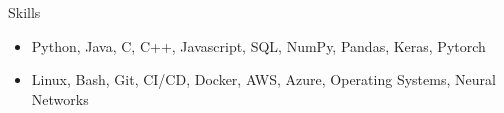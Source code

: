 \documentclass[]{mcdowellcv}
\begin{document}
\begin{cvsection}{Skills}
	\begin{cvsubsection}{}{}{}
		\begin{itemize}
			\item  Python, Java, C, C++, Javascript, SQL, NumPy, Pandas, Keras, Pytorch
			\item  Linux, Bash, Git, CI/CD, Docker, AWS, Azure, Operating Systems, Neural Networks
		\end{itemize}
	\end{cvsubsection}
\end{cvsection}


\ 
\end{document}
